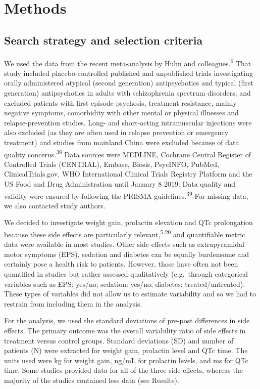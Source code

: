 \documentclass[
  9pt,
  english,
  ,jou,floatsintext]{apa6}
\begin{document}
\hypertarget{methods}{%
\section{Methods}\label{methods}}

\hypertarget{search-strategy-and-selection-criteria}{%
\subsection{Search strategy and selection criteria}\label{search-strategy-and-selection-criteria}}

We used the data from the recent meta-analysis by Huhn and
colleagues.\textsuperscript{6} That study included placebo-controlled published
and unpublished trials investigating orally administered atypical
(second generation) antipsychotics and typical (first generation)
antipsychotics in adults with schizophrenia spectrum disorders; and
excluded patients with first episode psychosis, treatment resistance,
mainly negative symptoms, comorbidity with other mental or physical
illnesses and relapse-prevention studies. Long- and short-acting
intramuscular injections were also excluded (as they are often used in
relapse prevention or emergency treatment) and studies from mainland
China were excluded because of data quality concerns.\textsuperscript{38}
Data sources were MEDLINE, Cochrane Central Register of Controlled Trials
(CENTRAL), Embase, Biosis, PsycINFO, PubMed, ClinicalTrials.gov, WHO
International Clinical Trials Registry Platform and the US Food and Drug
Administration until January 8 2019. Data quality and validity were
ensured by following the PRISMA guidelines.\textsuperscript{39} For missing
data, we also contacted study authors.

We decided to investigate weight gain, prolactin elevation and
QTc prolongation because these side effects are particularly relevant,\textsuperscript{5,20} and quantifiable metric data were
available in most studies. Other side effects such as
extrapyramidal motor symptoms (EPS), sedation and diabetes can be
equally burdensome and certainly pose a health risk to patients.
However, those have often not been quantified in studies but rather
assessed qualitatively (e.g.~through categorical variables such as
EPS: yes/no; sedation: yes/no; diabetes: treated/untreated).
These types of variables did not allow us to estimate variability
and so we had to restrain from including them in the analysis.

For the analysis, we used the standard deviations of pre-post
differences in side effects. The primary outcome was the
overall variability ratio of side effects in treatment versus control groups.
Standard deviations (SD) and number of patients (N) were
extracted for weight gain, prolactin level and QTc time. The units used
were kg for weight gain, ng/mL for prolactin levels, and ms for QTc
time. Some studies provided data for all of the three side effects,
whereas the majority of the studies contained less data (see Results).
\end{document}
